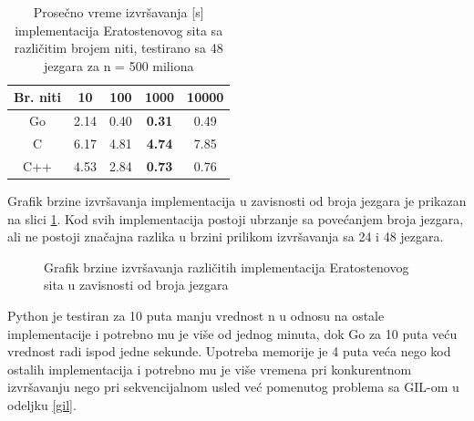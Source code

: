 \documentclass[12pt,oneside]{memoir}
\begin{document}
\begin{table}
\begin{center}
\caption{Prosečno vreme izvršavanja [s] implementacija Eratostenovog sita sa različitim brojem niti, testirano sa 48 jezgara za n = 500 miliona}
\begin{tabular}{||c||c c c c||}
\hline
Br. niti		&10 &100 &1000 &10000\\ \hline
Go	&2.14	&0.40	&\textbf{0.31}&0.49\\ \hline
C	&6.17	&4.81	&\textbf{4.74}&7.85\\ \hline
C++  &4.53	&2.84	&\textbf{0.73}&0.76\\ \hline
\end{tabular}
\label{tab:prime5}
\end{center}
\end{table}


Grafik brzine izvršavanja implementacija u zavisnosti od broja jezgara je prikazan na slici \ref{fig:prime3}. Kod svih implementacija postoji ubrzanje sa povećanjem broja jezgara, ali ne postoji značajna razlika u brzini prilikom izvršavanja sa 24 i 48 jezgara.


\begin{figure}
\begin{center}


\caption{Grafik brzine izvršavanja različitih implementacija Eratostenovog sita u zavisnosti od broja jezgara}
\label{fig:prime3}
\end{center}
\end{figure}

Python je testiran za 10 puta manju vrednost n u odnosu na ostale implementacije i potrebno mu je više od jednog minuta, dok Go za 10 puta veću vrednost radi ispod jedne sekunde. Upotreba memorije je 4 puta veća nego kod ostalih implementacija i potrebno mu je više vremena pri konkurentnom izvršavanju nego pri sekvencijalnom usled već pomenutog problema sa GIL-om u odeljku \ref{gil}.
\end{document}
